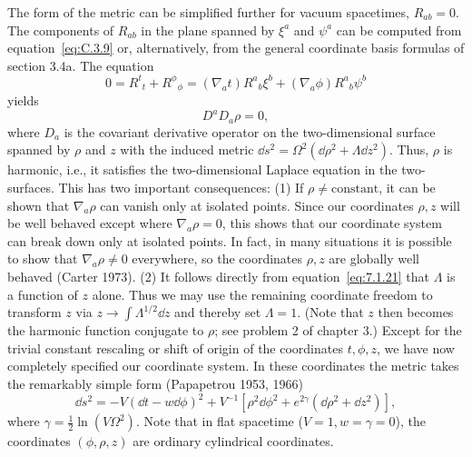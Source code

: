 The form of the metric can be simplified further for vacuum spacetimes,
\(R_{ab}=0\). The components of \(R_{ab}\) in the plane spanned by \(\xi^a\) and
\(\psi^a\) can be computed from equation~\eqref{eq:C.3.9} or, alternatively, from
the general coordinate basis formulas of section 3.4a. The equation
\begin{equation}
  0=R^t{}_t+R^\phi{}_\phi
   =(\nabla_at)R^a{}_b\xi^b+(\nabla_a\phi)R^a{}_b\psi^b
  \tag{7.1.20}\label{eq:7.1.20}
\end{equation}
yields
\begin{equation}
  D^aD_a\rho=0 ,
  \tag{7.1.21}\label{eq:7.1.21}
\end{equation}
where \(D_a\) is the covariant derivative operator on the two-dimensional surface
spanned by \(\rho\) and \(z\) with the induced metric
\(\dd s^2=\Omega^2(\dd\rho^2+\Lambda\dd z^2)\). Thus, \(\rho\) is harmonic,
i.e., it satisfies the two-dimensional Laplace equation in the two-surfaces. This has
two important consequences: (1) If \(\rho\ne\text{constant}\), it can be shown that
\(\nabla_a\rho\) can vanish only at isolated points. Since our coordinates \(\rho,z\)
will be well behaved except where \(\nabla_a\rho=0\), this shows that our coordinate
system can break down only at isolated points. In fact, in many situations it is
possible to show that \(\nabla_a\rho\ne0\) everywhere, so the coordinates \(\rho,z\)
are globally well behaved (Carter 1973). (2) It follows directly from
equation~\eqref{eq:7.1.21} that \(\Lambda\) is a function of \(z\) alone. Thus we may
use the remaining coordinate freedom to transform \(z\) via
\(z\longrightarrow\int\Lambda^{1/2}\dd z\) and thereby set \(\Lambda=1\). (Note
that \(z\) then becomes the harmonic function conjugate to \(\rho\); see problem 2
of chapter 3.) Except for the trivial constant rescaling or shift of origin of the
coordinates \(t,\phi,z\), we have now completely specified our coordinate system.
In these coordinates the metric takes the remarkably simple form (Papapetrou 1953,
1966)
\begin{equation}
  \dd s^2=-V(\dd t-w\dd\phi)^2
    +V^{-1}[\rho^2\dd\phi^2+e^{2\gamma}(\dd\rho^2+\dd z^2)] ,
  \tag{7.1.22}\label{eq:7.1.22}
\end{equation}
where \(\gamma=\tfrac12\ln(V\Omega^2)\). Note that in flat spacetime
(\(V=1,w=\gamma=0\)), the coordinates \((\phi,\rho,z)\) are ordinary cylindrical
coordinates.

